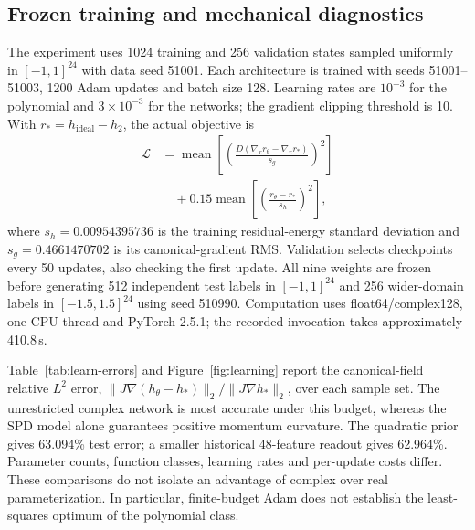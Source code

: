 \subsection{Frozen training and mechanical diagnostics}
The experiment uses 1024 training and 256 validation states sampled uniformly in $[-1,1]^{24}$ with data seed 51001. Each architecture is trained with seeds 51001--51003, 1200 Adam updates and batch size 128. Learning rates are $10^{-3}$ for the polynomial and $3\times10^{-3}$ for the networks; the gradient clipping threshold is 10. With $r_*=h_{\mathrm{ideal}}-h_2$, the actual objective is
\begin{equation}
 \begin{aligned}
 \mathcal L&=\operatorname{mean}\left[\left(\frac{D(\nabla_xr_\theta-\nabla_xr_*)}{s_g}\right)^2\right]\\
 &\quad+0.15\operatorname{mean}\left[\left(\frac{r_\theta-r_*}{s_h}\right)^2\right],
 \end{aligned}
 \label{eq:learn-objective}
\end{equation}
where $s_h=0.00954395736$ is the training residual-energy standard deviation and $s_g=0.4661470702$ is its canonical-gradient RMS. Validation selects checkpoints every 50 updates, also checking the first update. All nine weights are frozen before generating 512 independent test labels in $[-1,1]^{24}$ and 256 wider-domain labels in $[-1.5,1.5]^{24}$ using seed 510990. Computation uses float64/complex128, one CPU thread and PyTorch 2.5.1; the recorded invocation takes approximately 410.8\,s.

Table~\ref{tab:learn-errors} and Figure~\ref{fig:learning} report the canonical-field relative $L^2$ error, $\|J\nabla(h_\theta-h_*)\|_2/\|J\nabla h_*\|_2$, over each sample set. The unrestricted complex network is most accurate under this budget, whereas the SPD model alone guarantees positive momentum curvature. The quadratic prior gives 63.094\% test error; a smaller historical 48-feature readout gives 62.964\%. Parameter counts, function classes, learning rates and per-update costs differ. These comparisons do not isolate an advantage of complex over real parameterization. In particular, finite-budget Adam does not establish the least-squares optimum of the polynomial class.

